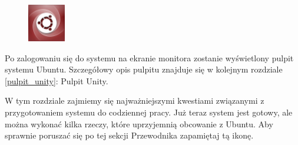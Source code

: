 \begin{figure}
	\includegraphics[width=\linewidth]{images/ikony_dash.png}
\end{figure}

Po zalogowaniu się do systemu na ekranie monitora zostanie wyświetlony pulpit systemu Ubuntu. Szczegółowy opis pulpitu znajduje się w kolejnym rozdziale \ref{pulpit_unity}: Pulpit Unity.

W tym rozdziale zajmiemy się najważniejszymi kwestiami związanymi z przygotowaniem systemu do codziennej pracy. Już teraz system jest gotowy, ale można wykonać kilka rzeczy, które uprzyjemnią obcowanie z Ubuntu. Aby sprawnie poruszać się po tej sekcji Przewodnika zapamiętaj tą ikonę.